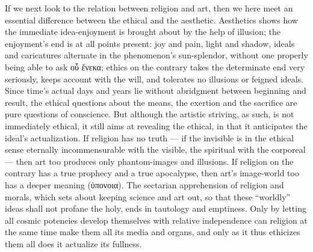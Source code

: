 \documentclass[12pt]{book}
\begin{document}
If we next look to the relation between religion and art, then we here meet
an essential difference between the ethical and the aesthetic. Aesthetics
shows how the immediate idea-enjoyment is brought about by the help of
illusion; the enjoyment's end is at all points present: joy and pain, light
and shadow, ideals and caricatures alternate in the phenomenon's
sun-splendor, without one properly being able to ask οὗ ἕνεκα; ethics on
the contrary takes the determinate end very seriously, keeps account with
the will, and tolerates no illusions or feigned ideals. Since time's actual
days and years lie without abridgment between beginning and result, the
ethical questions about the means, the exertion and the sacrifice are pure
questions of conscience. But although the artistic striving, as such, is not
immediately ethical, it still aims at revealing the ethical, in that it
anticipates the ideal's actualization. If religion has no truth --- if the
invisible is in the ethical sense eternally incommensurable with the
visible, the spiritual with the corporeal --- then art too produces only
phantom-images and illusions. If religion on the contrary has a true
prophecy and a true apocalypse, then art's image-world too has a deeper
meaning (ὑπονοια). The sectarian apprehension of religion and morals, which
sets about keeping science and art out, so that these ``worldly'' ideas
shall not profane the holy, ends in tautology and emptiness. Only by letting
all cosmic potencies develop themselves with relative independence can
religion at the same time make them all its media and organs, and only as it
thus ethicizes them all does it actualize its fullness.
\end{document}
